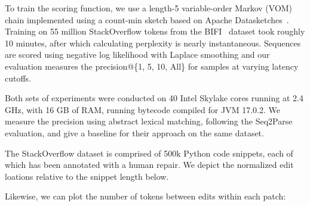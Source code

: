 To train the scoring function, we use a length-5 variable-order Markov (VOM) chain implemented using a count-min sketch based on Apache Datasketches~\cite{apache2022datasketches}. Training on 55 million StackOverflow tokens from the BIFI~\cite{yasunaga2021break} dataset took roughly 10 minutes, after which calculating perplexity is nearly instantaneous. Sequences are scored using negative log likelihood with Laplace smoothing and our evaluation measures the precision@\{1, 5, 10, All\} for samples at varying latency cutoffs.

Both sets of experiments were conducted on 40 Intel Skylake cores running at 2.4 GHz, with 16 GB of RAM, running bytecode compiled for JVM 17.0.2. We measure the precision using abstract lexical matching, following the Seq2Parse~\cite{sakkas2022seq2parse} evaluation, and give a baseline for their approach on the same dataset.

The StackOverflow dataset is comprised of 500k Python code snippets, each of which has been annotated with a human repair. We depict the normalized edit loations relative to the snippet length below.

\begin{figure}[h!]
\end{figure}

\noindent Likewise, we can plot the number of tokens between edits within each patch:

\begin{figure}[h!]
\end{figure}

